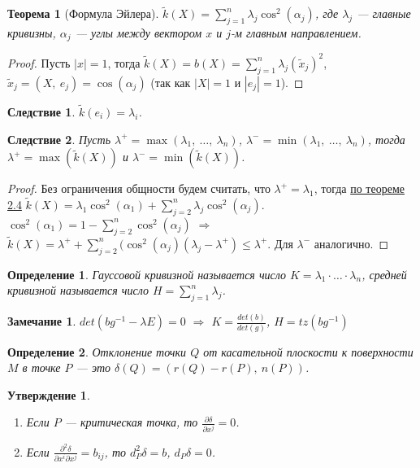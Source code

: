 \documentclass[12pt]{article}
\newcommand\tab[1][.5cm]{\hspace*{#1}}
\theoremstyle{plain}
\newtheorem{theorem}{Теорема}[section]
\newtheorem{consequence}{Следствие}[theorem]
\newtheorem{subtheorem}{Утверждение}[section]
\newtheorem{definition}{Определение}[section]
\newtheorem{remark}{Замечание}
\begin{document}
    \begin{theorem}[\hypertarget{7}{Формула Эйлера}]
        $\tilde{k}(X)=\sum\limits_{j=1}^n\lambda_j\cos^2(\alpha_j)$, где $\lambda_j$ --- главные кривизны, $\alpha_j$ --- углы между вектором $x$ и $j$-м главным направлением.
    \end{theorem}
    \begin{proof}
        Пусть $|x|=1$, тогда $\tilde{k}(X)=b(X)=\sum\limits_{j=1}^n\lambda_j(\tilde{x}_j)^2$, $\tilde{x}_j=(X, \ e_j)=\cos(\alpha_j)$ (так как $|X|=1$ и $|e_j|=1$).
    \end{proof}
    \begin{consequence}
        $\tilde{k}(e_i)=\lambda_i$.
    \end{consequence}
    \begin{consequence}
        Пусть $\lambda^+=\max(\lambda_1, \ \ldots, \ \lambda_n)$, $\lambda^-=\min(\lambda_1, \ \ldots, \ \lambda_n)$, тогда\\$\lambda^+=\max(\tilde{k}(X))$ и $\lambda^-=\min(\tilde{k}(X))$.
    \end{consequence}
    \begin{proof}
        Без ограничения общности будем считать, что $\lambda^+=\lambda_1$, тогда \hyperlink{7}{по теореме 2.4} $\tilde{k}(X)=\lambda_1\cos^2(\alpha_1)+\sum\limits_{j=2}^n\lambda_j\cos^2(\alpha_j)$. $\cos^2(\alpha_1)=1-\sum\limits_{j=2}^n\cos^2(\alpha_j)$ $\Longrightarrow$ $\tilde{k}(X)=\lambda^++\sum\limits_{j=2}^n(\cos^2(\alpha_j)(\lambda_j-\lambda^+)\leqslant\lambda^+$. Для $\lambda^-$ аналогично.
    \end{proof}
    \begin{definition}
        Гауссовой кривизной называется число $K=\lambda_1\cdot\ldots\cdot\lambda_n$, средней кривизной называется число $H=\sum\limits_{j=1}^n\lambda_j$.
    \end{definition}
    \begin{remark}
        $det(bg^{-1}-\lambda E)=0$ $\Longrightarrow$ $K=\frac{det(b)}{det(g)}$, $H=tz(bg^{-1})$
    \end{remark}
    \begin{definition}
        Отклонение точки $Q$ от касательной плоскости к поверхности $M$ в точке $P$ --- это $\delta(Q)=(r(Q)-r(P), \ n(P))$.
    \end{definition}
    \begin{subtheorem}\tab
        \begin{enumerate}
            \item Если $P$ --- критическая точка, то $\frac{\partial\delta}{\partial x^j}=0$.
            \item Если $\frac{\partial^2\delta}{\partial x^i\partial x^j}=b_{ij}$, то $d_P^2\delta=b$, $d_P\delta=0$.
        \end{enumerate}
    \end{subtheorem}
\end{document}
